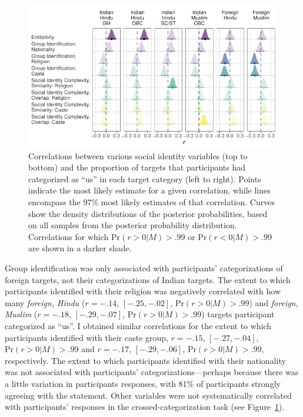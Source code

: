 \documentclass[12pt, a4paper]{article}
\begin{document}
\begin{figure}
\centering
\includegraphics{../figures/appendices/appendices-e-1}
\caption[Correlations between social identity variables and target categorizations]{Correlations between various social identity variables (top to bottom) and the proportion of targets that participants had categorized as ``us'' in each target category (left to right). Points indicate the most likely estimate for a given correlation, while lines encompass the 97\% most likely estimates of that correlation. Curves show the density distributions of the posterior probabilities, based on all samples from the posterior probability distribution. Correlations for which $\text{Pr} (r > 0| M) > .99$ or $\text{Pr} (r < 0| M) > .99$ are shown in a darker shade.}
\label{fig:a-1}
\end{figure}

Group identification was only associated with participants' categorizations of foreign targets, not their categorizations of Indian targets. The extent to which participants identified with their religion was negatively correlated with how many \emph{foreign, Hindu} ($r = -.14$, $[-.25, -.02]$, $\text{Pr} (r > 0| M) > .99$) and \emph{foreign, Muslim} ($r = -.18$, $[-.29, -.07]$, $\text{Pr} (r > 0| M) > .99$) targets participant categorized as ``us''. I obtained similar correlations for the extent to which participants identified with their caste group, $r = -.15$, $[-.27, -.04]$, $\text{Pr} (r > 0| M) > .99$ and $r = -.17$, $[-.29, -.06]$, $\text{Pr} (r > 0| M) > .99$, respectively. The extent to which participants identified with their nationality was not associated with participants' categorizations---perhaps because there was a little variation in participants responses, with 81\% of participants strongly agreeing with the statement. Other variables were not systematically correlated with participants' responses in the crossed-categorization task (see Figure~\ref{fig:a-1}).
\end{document}

